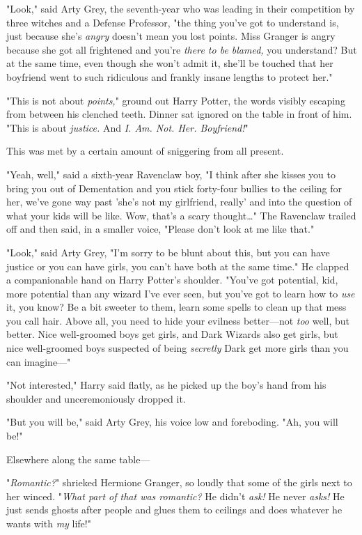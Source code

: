"Look," said Arty Grey, the seventh-year who was leading in their competition 
by three witches and a Defense Professor, "the thing you've got to understand 
is, just because she's \emph{angry} doesn't mean you lost points. Miss Granger 
is angry because she got all frightened and you're \emph{there to be blamed,} 
you understand? But at the same time, even though she won't admit it, she'll be 
touched that her boyfriend went to such ridiculous and frankly insane lengths 
to protect her."

"This is not about \emph{points,}" ground out Harry Potter, the words visibly 
escaping from between his clenched teeth. Dinner sat ignored on the table in 
front of him. "This is about \emph{justice.} And \emph{I. Am. Not. Her. 
Boyfriend!}"

This was met by a certain amount of sniggering from all present.

"Yeah, well," said a sixth-year Ravenclaw boy, "I think after she kisses you to 
bring you out of Dementation and you stick forty-four bullies to the ceiling 
for her, we've gone way past 'she's not my girlfriend, really' and into the 
question of what your kids will be like. Wow, that's a scary thought{\ldots}" 
The Ravenclaw trailed off and then said, in a smaller voice, "Please don't look 
at me like that."

"Look," said Arty Grey, "I'm sorry to be blunt about this, but you can have 
justice or you can have girls, you can't have both at the same time." He 
clapped a companionable hand on Harry Potter's shoulder. "You've got potential, 
kid, more potential than any wizard I've ever seen, but you've got to learn how 
to \emph{use} it, you know? Be a bit sweeter to them, learn some spells to 
clean up that mess you call hair. Above all, you need to hide your evilness 
better---not \emph{too} well, but better. Nice well-groomed boys get girls, and 
Dark Wizards also get girls, but nice well-groomed boys suspected of being 
\emph{secretly} Dark get more girls than you can imagine---"

"Not interested," Harry said flatly, as he picked up the boy's hand from his 
shoulder and unceremoniously dropped it.

"But you will be," said Arty Grey, his voice low and foreboding. "Ah, you will 
be!"

Elsewhere along the same table---

"\emph{Romantic?}" shrieked Hermione Granger, so loudly that some of the girls 
next to her winced. "\emph{What part of that was romantic?} He didn't 
\emph{ask!} He never \emph{asks!} He just sends ghosts after people and glues 
them to ceilings and does whatever he wants with \emph{my} life!"

